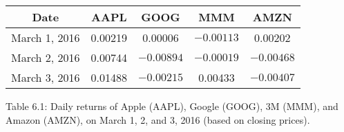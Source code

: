\begin{table}
\begin{tabular}{c c c c c} \hline \hline Date & AAPL & GOOG & MMM & AMZN \\ \hline March 1, 2016 & 0.00219 & 0.00006 & \(-0.00113\) & 0.00202 \\ March 2, 2016 & 0.00744 & \(-0.00894\) & \(-0.00019\) & \(-0.00468\) \\ March 3, 2016 & 0.01488 & \(-0.00215\) & 0.00433 & \(-0.00407\) \\ \hline \hline \end{tabular}
\end{table}
Table 6.1: Daily returns of Apple (AAPL), Google (GOOG), 3M (MMM), and Amazon (AMZN), on March 1, 2, and 3, 2016 (based on closing prices).

 